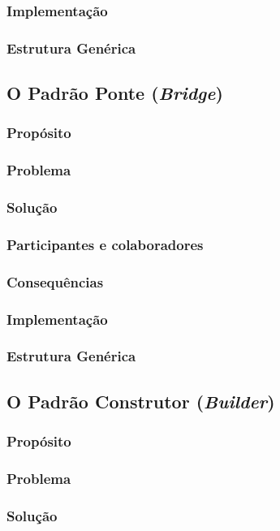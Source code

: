 \documentclass[
	11pt,				%
	openright,
	twoside,			%
	a4paper,			%
	english,			%
	french,
	brazil,				%
	sumario=tradicional
	]{abntex2}
\begin{document}
\subsubsection{Implementação}
\subsubsection{Estrutura Genérica}

\subsection{O Padrão Ponte (\textit{Bridge})}
\subsubsection{Propósito}
\subsubsection{Problema}
\subsubsection{Solução}
\subsubsection{Participantes e colaboradores}
\subsubsection{Consequências}
\subsubsection{Implementação}
\subsubsection{Estrutura Genérica}

\subsection{O Padrão Construtor (\textit{Builder})}
\subsubsection{Propósito}
\subsubsection{Problema}
\subsubsection{Solução}
\end{document}
